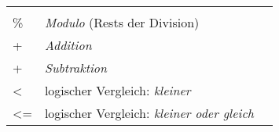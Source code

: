 \begin{longtable}[c]{@{}lll@{}}
\begin{minipage}[t]{0.15\columnwidth}
\end{minipage}
\\\noalign{\medskip}
\begin{minipage}[t]{0.08\columnwidth}\raggedright
\%
\end{minipage} & \begin{minipage}[t]{0.77\columnwidth}\raggedright
\emph{Modulo} (Rests der Division)
\end{minipage} & \begin{minipage}[t]{0.15\columnwidth}\raggedright
\end{minipage}
\\\noalign{\medskip}
\begin{minipage}[t]{0.08\columnwidth}\raggedright
+
\end{minipage} & \begin{minipage}[t]{0.77\columnwidth}\raggedright
\emph{Addition}
\end{minipage} & \begin{minipage}[t]{0.15\columnwidth}\raggedright
\end{minipage}
\\\noalign{\medskip}
\begin{minipage}[t]{0.08\columnwidth}\raggedright
+
\end{minipage} & \begin{minipage}[t]{0.77\columnwidth}\raggedright
\emph{Subtraktion}
\end{minipage} & \begin{minipage}[t]{0.15\columnwidth}\raggedright
\end{minipage}
\\\noalign{\medskip}
\begin{minipage}[t]{0.08\columnwidth}\raggedright
\textless{}
\end{minipage} & \begin{minipage}[t]{0.77\columnwidth}\raggedright
logischer Vergleich: \emph{kleiner}
\end{minipage} & \begin{minipage}[t]{0.15\columnwidth}\raggedright
\end{minipage}
\\\noalign{\medskip}
\begin{minipage}[t]{0.08\columnwidth}\raggedright
\textless{}=
\end{minipage} & \begin{minipage}[t]{0.77\columnwidth}\raggedright
logischer Vergleich: \emph{kleiner oder gleich}
\end{minipage} & \begin{minipage}[t]{0.15\columnwidth}\raggedright

\end{minipage}
\end{longtable}
